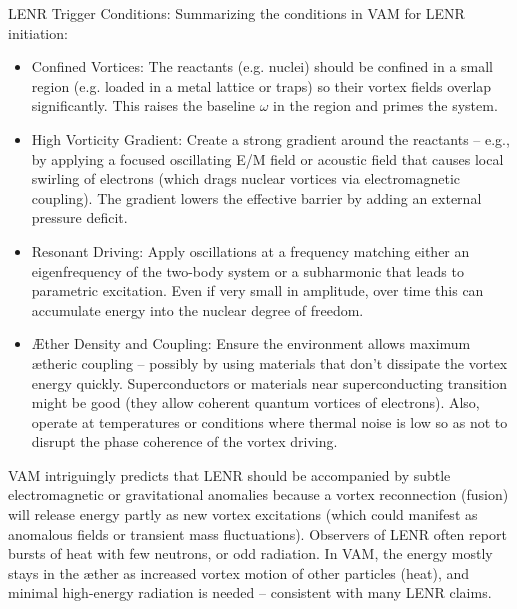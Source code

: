 LENR Trigger Conditions: Summarizing the conditions in VAM for LENR initiation:


\begin{itemize}

\item 
Confined Vortices: The reactants (e.g. nuclei) should be confined in a small region (e.g. loaded in a metal lattice or traps) so their vortex fields overlap significantly. This raises the baseline $\omega$ in the region and primes the system.




\item 
High Vorticity Gradient: Create a strong gradient around the reactants – e.g., by applying a focused oscillating E/M field or acoustic field that causes local swirling of electrons (which drags nuclear vortices via electromagnetic coupling). The gradient lowers the effective barrier by adding an external pressure deficit.




\item 
Resonant Driving: Apply oscillations at a frequency matching either an eigenfrequency of the two-body system or a subharmonic that leads to parametric excitation. Even if very small in amplitude, over time this can accumulate energy into the nuclear degree of freedom.




\item 
Æther Density and Coupling: Ensure the environment allows maximum ætheric coupling – possibly by using materials that don't dissipate the vortex energy quickly. Superconductors or materials near superconducting transition might be good (they allow coherent quantum vortices of electrons). Also, operate at temperatures or conditions where thermal noise is low so as not to disrupt the phase coherence of the vortex driving.




\end{itemize}

VAM intriguingly predicts that LENR should be accompanied by subtle electromagnetic or gravitational anomalies because a vortex reconnection (fusion) will release energy partly as new vortex excitations (which could manifest as anomalous fields or transient mass fluctuations). Observers of LENR often report bursts of heat with few neutrons, or odd radiation. In VAM, the energy mostly stays in the æther as increased vortex motion of other particles (heat), and minimal high-energy radiation is needed – consistent with many LENR claims.



